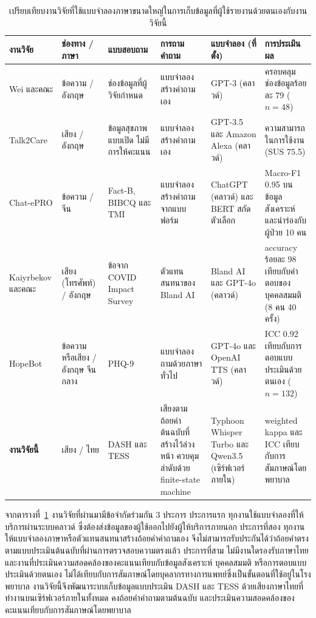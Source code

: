 \begin{table}[htbp]
\centering
\small
\renewcommand{\arraystretch}{1.25}
\setlength{\tabcolsep}{3pt}
\begin{tabular}{|>{\raggedright\arraybackslash}p{2.2cm}
                |>{\raggedright\arraybackslash}p{1.7cm}
                |>{\raggedright\arraybackslash}p{2.15cm}
                |>{\raggedright\arraybackslash}p{2.2cm}
                |>{\raggedright\arraybackslash}p{2.4cm}
                |>{\raggedright\arraybackslash}p{2.5cm}|}
\hline
\textbf{งานวิจัย} & \textbf{ช่องทาง / ภาษา} & \textbf{แบบสอบถาม} & \textbf{การถามคำถาม} & \textbf{แบบจำลอง (ที่ตั้ง)} & \textbf{การประเมินผล} \\
\hline
Wei และคณะ \citep{Wei2024} & ข้อความ / อังกฤษ & ช่องข้อมูลที่ผู้วิจัยกำหนด & แบบจำลองสร้างคำถามเอง & GPT-3 (คลาวด์) & ครอบคลุมช่องข้อมูลร้อยละ 79 ($n=48$) \\
\hline
Talk2Care \citep{Yang2024} & เสียง / อังกฤษ & ข้อมูลสุขภาพแบบเปิด ไม่มีการให้คะแนน & แบบจำลองสร้างคำถามเอง & GPT-3.5 และ Amazon Alexa (คลาวด์) & ความสามารถในการใช้งาน (SUS 75.5) \\
\hline
Chat-ePRO \citep{Chen2024} & ข้อความ / จีน & Fact-B, BIBCQ และ TMI & แบบจำลองสร้างคำถามจากแบบฟอร์ม & ChatGPT (คลาวด์) และ BERT สกัดตัวเลือก & Macro-F1 0.95 บนข้อมูลสังเคราะห์ และนำร่องกับผู้ป่วย 10 คน \\
\hline
Kaiyrbekov และคณะ \citep{Kaiyrbekov2025} & เสียง (โทรศัพท์) / อังกฤษ & 33 ข้อจาก COVID Impact Survey & ตัวแทนสนทนาของ Bland AI & Bland AI และ GPT-4o (คลาวด์) & accuracy ร้อยละ 98 เทียบกับคำตอบของบุคคลสมมติ (8 คน 40 ครั้ง) \\
\hline
HopeBot \citep{Guo2025} & ข้อความหรือเสียง / อังกฤษ จีนกลาง & PHQ-9 & แบบจำลองถามด้วยภาษาทั่วไป & GPT-4o และ OpenAI TTS (คลาวด์) & ICC 0.92 เทียบกับการตอบแบบประเมินด้วยตนเอง ($n=132$) \\
\hline
\textbf{งานวิจัยนี้} & เสียง / ไทย & DASH และ TESS & เสียงตามถ้อยคำต้นฉบับที่สร้างไว้ล่วงหน้า ควบคุมลำดับด้วย finite-state machine & Typhoon Whisper Turbo และ Qwen3.5 (เซิร์ฟเวอร์ภายใน) & weighted kappa และ ICC เทียบกับการสัมภาษณ์โดยพยาบาล \\
\hline
\end{tabular}
\caption{เปรียบเทียบงานวิจัยที่ใช้แบบจำลองภาษาขนาดใหญ่ในการเก็บข้อมูลที่ผู้ใช้รายงานด้วยตนเองกับงานวิจัยนี้}
\label{tab:related-compare}
\end{table}

จากตารางที่~\ref{tab:related-compare} งานวิจัยที่ผ่านมามีข้อจำกัดร่วมกัน 3 ประการ
ประการแรก ทุกงานใช้แบบจำลองที่ให้บริการผ่านระบบคลาวด์ ซึ่งต้องส่งข้อมูลของผู้ใช้ออกไปยังผู้ให้บริการภายนอก
ประการที่สอง ทุกงานให้แบบจำลองภาษาหรือตัวแทนสนทนาสร้างถ้อยคำคำถามเอง จึงไม่สามารถรับประกันได้ว่าถ้อยคำตรงตามแบบประเมินต้นฉบับที่ผ่านการตรวจสอบความตรงแล้ว \citep{Coons2009}
ประการที่สาม ไม่มีงานใดรองรับภาษาไทย และงานที่ประเมินความสอดคล้องของคะแนนเทียบกับข้อมูลสังเคราะห์ บุคคลสมมติ หรือการตอบแบบประเมินด้วยตนเอง
ไม่ได้เทียบกับการสัมภาษณ์โดยบุคลากรทางการแพทย์ซึ่งเป็นขั้นตอนที่ใช้อยู่ในโรงพยาบาล
งานวิจัยนี้จึงพัฒนาระบบเก็บข้อมูลแบบประเมิน DASH และ TESS ด้วยเสียงภาษาไทยที่ทำงานบนเซิร์ฟเวอร์ภายในทั้งหมด
คงถ้อยคำคำถามตามต้นฉบับ และประเมินความสอดคล้องของคะแนนเทียบกับการสัมภาษณ์โดยพยาบาล
